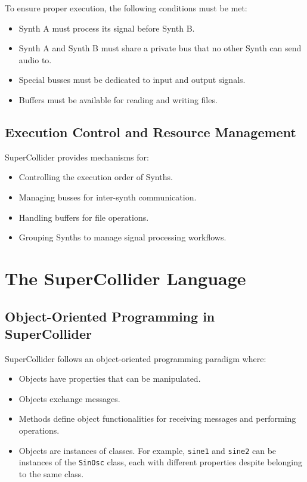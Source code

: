 To ensure proper execution, the following conditions must be met:

\begin{itemize}
    \item Synth A must process its signal before Synth B.
    \item Synth A and Synth B must share a private bus that no other Synth can send audio to.
    \item Special busses must be dedicated to input and output signals.
    \item Buffers must be available for reading and writing files.
\end{itemize}

\subsection{Execution Control and Resource Management}

SuperCollider provides mechanisms for:

\begin{itemize}
    \item Controlling the execution order of Synths.
    \item Managing busses for inter-synth communication.
    \item Handling buffers for file operations.
    \item Grouping Synths to manage signal processing workflows.
\end{itemize}

\section{The SuperCollider Language}

\subsection{Object-Oriented Programming in SuperCollider}

SuperCollider follows an object-oriented programming paradigm where:

\begin{itemize}
    \item Objects have properties that can be manipulated.
    \item Objects exchange messages.
    \item Methods define object functionalities for receiving messages and performing operations.
    \item Objects are instances of classes. For example, \texttt{sine1} and \texttt{sine2} can be instances of the \texttt{SinOsc} class, each with different properties despite belonging to the same class.
\end{itemize}

